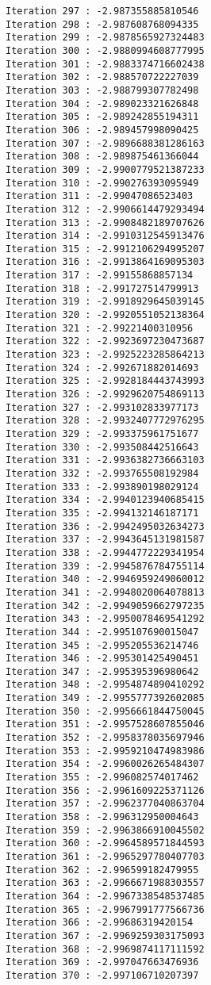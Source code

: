 \documentclass[11pt]{article}
\begin{document}
\begin{Verbatim}[commandchars=\\\{\}]
Iteration 297 : -2.987355885810546
Iteration 298 : -2.987608768094335
Iteration 299 : -2.9878565927324483
Iteration 300 : -2.9880994608777995
Iteration 301 : -2.9883374716602438
Iteration 302 : -2.988570722227039
Iteration 303 : -2.988799307782498
Iteration 304 : -2.989023321626848
Iteration 305 : -2.989242855194311
Iteration 306 : -2.989457998090425
Iteration 307 : -2.9896688381286163
Iteration 308 : -2.989875461366044
Iteration 309 : -2.9900779521387233
Iteration 310 : -2.990276393095949
Iteration 311 : -2.99047086523403
Iteration 312 : -2.9906614479293494
Iteration 313 : -2.9908482189707626
Iteration 314 : -2.9910312545913476
Iteration 315 : -2.9912106294995207
Iteration 316 : -2.9913864169095303
Iteration 317 : -2.99155868857134
Iteration 318 : -2.991727514799913
Iteration 319 : -2.9918929645039145
Iteration 320 : -2.9920551052138364
Iteration 321 : -2.99221400310956
Iteration 322 : -2.9923697230473687
Iteration 323 : -2.9925223285864213
Iteration 324 : -2.992671882014693
Iteration 325 : -2.9928184443743993
Iteration 326 : -2.9929620754869113
Iteration 327 : -2.993102833977173
Iteration 328 : -2.9932407772976295
Iteration 329 : -2.993375961751677
Iteration 330 : -2.993508442516643
Iteration 331 : -2.9936382736663103
Iteration 332 : -2.993765508192984
Iteration 333 : -2.993890198029124
Iteration 334 : -2.9940123940685415
Iteration 335 : -2.994132146187171
Iteration 336 : -2.9942495032634273
Iteration 337 : -2.9943645131981587
Iteration 338 : -2.9944772229341954
Iteration 339 : -2.9945876784755114
Iteration 340 : -2.9946959249060012
Iteration 341 : -2.9948020064078813
Iteration 342 : -2.9949059662797235
Iteration 343 : -2.9950078469541292
Iteration 344 : -2.995107690015047
Iteration 345 : -2.995205536214746
Iteration 346 : -2.995301425490451
Iteration 347 : -2.995395396980642
Iteration 348 : -2.9954874890410292
Iteration 349 : -2.9955777392602085
Iteration 350 : -2.9956661844750045
Iteration 351 : -2.9957528607855046
Iteration 352 : -2.9958378035697946
Iteration 353 : -2.9959210474983986
Iteration 354 : -2.9960026265484307
Iteration 355 : -2.996082574017462
Iteration 356 : -2.9961609225371126
Iteration 357 : -2.9962377040863704
Iteration 358 : -2.996312950004643
Iteration 359 : -2.9963866910045502
Iteration 360 : -2.9964589571844593
Iteration 361 : -2.9965297780407703
Iteration 362 : -2.996599182479955
Iteration 363 : -2.9966671988303557
Iteration 364 : -2.9967338548537485
Iteration 365 : -2.9967991777566736
Iteration 366 : -2.99686319420154
Iteration 367 : -2.9969259303175093
Iteration 368 : -2.9969874117111592
Iteration 369 : -2.997047663476936
Iteration 370 : -2.997106710207397

\end{Verbatim}
\end{document}
